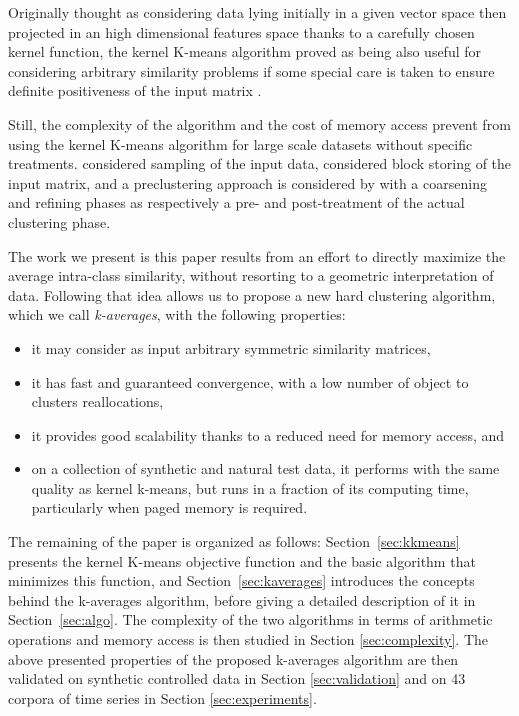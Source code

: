 \documentclass[a4paper,twoside]{article}
\begin{document}
Originally thought as considering data lying initially in a given vector space then projected in an high dimensional features space thanks to a carefully chosen kernel function, the kernel K-means algorithm proved as being also useful for considering arbitrary similarity problems if some special care is taken to ensure definite positiveness of the input matrix \cite{Roth:2003:OCP:960254.960291}. 

Still, the complexity of the algorithm and the cost of memory  access  prevent from using the kernel K-means algorithm for large scale datasets without specific treatments. \cite{Chitta:2011:AKK:2020408.2020558} considered sampling of the input data, \cite{1047453} considered block storing of the input matrix, and a preclustering  approach \cite{bradley98scaling, conf/icde/GantiRGPF99} is considered by 
\cite{Kulis2008} with a coarsening and refining phases as respectively a pre- and post-treatment of the actual clustering phase.

The work we present is this paper results from an effort to directly maximize the average intra-class similarity, without resorting to a geometric interpretation of data. Following that idea allows us to propose a new hard clustering algorithm, which we call \emph{k-averages}, with the following properties: 
\begin{itemize}
\item it may consider as input arbitrary symmetric similarity matrices,
\item it has fast and guaranteed convergence, with a low number of object to clusters reallocations,
\item it provides good scalability thanks to a reduced need for memory access, and
\item on a collection of synthetic and natural test data, it performs with the same quality as kernel k-means, but runs in a fraction of its computing time, particularly when paged memory is required.
\end{itemize}

The remaining of the paper is organized as follows: Section~\ref{sec:kkmeans} presents the kernel K-means objective function and the basic algorithm that minimizes this function, and Section~\ref{sec:kaverages} introduces the concepts behind the k-averages algorithm, before giving a detailed description of it in Section~\ref{sec:algo}. The complexity of the two algorithms in terms of arithmetic operations and memory access is then studied in Section \ref{sec:complexity}. The above presented properties of the proposed k-averages algorithm are then validated on synthetic controlled data in Section \ref{sec:validation} and on 43 corpora of time series in Section \ref{sec:experiments}.
\end{document}
